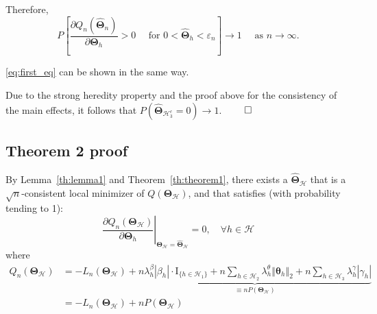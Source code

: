 \documentclass[12pt,letter]{article}\usepackage[]{graphicx}\usepackage[]{color}
\newcommand{\bTheta}{\boldsymbol{\Theta}}
\newcommand{\btheta}{\boldsymbol{\theta}}
\begin{document}
Therefore,
\[
P\left[\frac{\partial Q_{n}\left(\widehat{\boldsymbol{\Theta}}_{n}\right)}{\partial\bTheta_{h}}>0\quad\text{ for }0<\widehat{\bTheta}_{h}<\varepsilon_{n}\right]\rightarrow1\quad\text{ as }n\rightarrow\infty.
\]

\eqref{eq:first_eq} can be shown in the same way. 

Due to the strong heredity property and the proof above for the consistency of the main effects, it follows that $P\left(\widehat{\bTheta}_{\mathcal{H}_{3}^{c}}=0\right)\rightarrow1$. $\qed$

\subsection{Theorem 2 proof}

By Lemma~\eqref{th:lemma1} and Theorem~\eqref{th:theorem1}, there exists a $\widehat{\bTheta}_{\mathcal{H}}$ that is a $\sqrt{n}$-consistent local minimizer of $Q(\bTheta_{\mathcal{H}})$, and that satisfies (with probability tending to 1):
\begin{equation}
\left.\frac{\partial Q_{n}\left(\boldsymbol{\Theta}_{\mathcal{H}}\right)}{\partial\bTheta_{h}}\right|_{\boldsymbol{\Theta}_{\mathcal{H}}=\widehat{\boldsymbol{\Theta}}_{\mathcal{H}}}=0,\quad\forall h\in\mathcal{H}\label{eq:eq_14}
\end{equation}
where
\begin{align}
Q_n(\bTheta_{\mathcal{H}})
&=-L_n(\bTheta_{\mathcal{H}})+\underbrace{n\lambda_{h}^{\beta}\left|\beta_{h}\right| \cdot \textrm{I}_{\lbrace h \in \mathcal{H}_1 \rbrace} + n\sum_{h \in \mathcal{H}_2}      \lambda_{h}^{\theta}\left\Vert \btheta_{h}\right\Vert _{2}  +n\sum_{h \in \mathcal{H}_3}\lambda_{h}^{\gamma}\left|\gamma_{h}\right|}_{\equiv n P(\bTheta_{\mathcal{H}})} \nonumber \\
& = -L_n(\bTheta_{\mathcal{H}})+n P(\bTheta_{\mathcal{H}}) \label{eq:eq_14.5}
\end{align}
\end{document}
